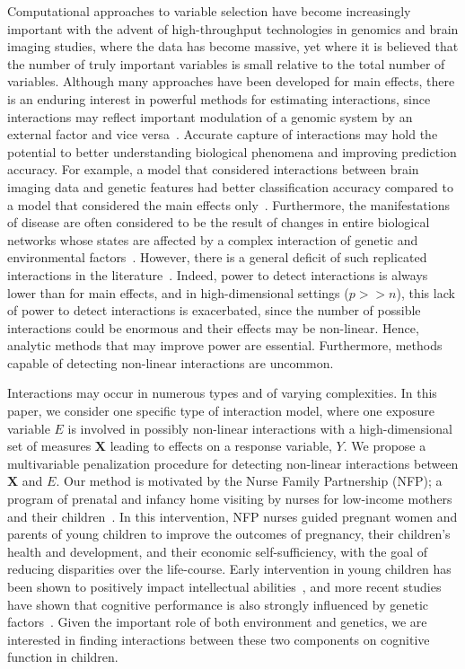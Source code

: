 \documentclass[useAMS,usenatbib,referee]{biom}
\newcommand{\mb}[1]{\mathbf{#1}}
\begin{document}
Computational approaches to variable selection have become increasingly important with the advent of high-throughput technologies in genomics and brain imaging studies, where the data has become massive, yet where it is believed that the number of truly important variables is small relative to the total number of variables.
Although many approaches have been developed for main effects, there is an enduring interest in powerful methods for estimating interactions, since interactions may reflect important modulation of a genomic system by an external factor and vice versa~\citep{bhatnagar2018analytic}.
Accurate capture of interactions may hold the potential to better understanding  biological phenomena and improving prediction accuracy.
For example, a model that considered interactions between brain imaging data and genetic features had better classification accuracy compared to a model that considered the main effects only~\citep{ning2018classifying}.
Furthermore, the manifestations of disease are often considered to be the result of changes in entire biological networks whose states are affected by a complex interaction of genetic and environmental factors~\citep{schadt2009molecular}.
However, there is a general deficit of such replicated interactions in the literature~\citep{timpson2018genetic}.
Indeed, power to detect interactions is always lower than for  main effects, and in high-dimensional settings ($p >> n$), this lack of power to detect interactions is exacerbated, since the number of possible interactions could be enormous and their effects may be non-linear. 
Hence, analytic methods that may improve power are essential. Furthermore, methods capable of detecting non-linear interactions are uncommon.

Interactions may occur in numerous types and of varying complexities. 
In this paper, we consider one specific type of interaction model, where one exposure variable $E$ is involved in possibly non-linear interactions with a high-dimensional set of measures $\mb{X}$ leading to effects on a response variable, $Y$. 
We propose a multivariable penalization procedure for detecting non-linear interactions between $\mb{X}$ and $E$. 
Our method is motivated by the Nurse Family Partnership (NFP); a program of prenatal and infancy home visiting by nurses for low-income mothers and their children~\citep{olds1998long}. 
In this intervention, NFP nurses guided pregnant women and parents of young children to improve the outcomes of pregnancy, their children's health and development, and their economic self-sufficiency, with the goal of reducing disparities over the life-course. 
Early intervention in young children has been shown to positively impact intellectual abilities~\citep{campbell1994effects}, and more recent studies have shown that cognitive performance is also strongly influenced by genetic factors~\citep{rietveld2013gwas}. 
Given the important role of both environment and genetics, we are interested in finding interactions between these two components on cognitive function in children. 
\end{document}
